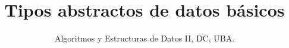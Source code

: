 \documentclass[a4paper,spanish, 10pt]{article}
\begin{document}
\pagestyle{fancy}
\thispagestyle{fancy}
\addtolength{\headheight}{1pt}
\cfoot{\thepage /\pageref{LastPage}}
\renewcommand{\footrulewidth}{0.4pt}

\author{Algoritmos y Estructuras de Datos II, DC, UBA.}
\date{}
\title{Tipos abstractos de datos básicos}









%




\end{document}
